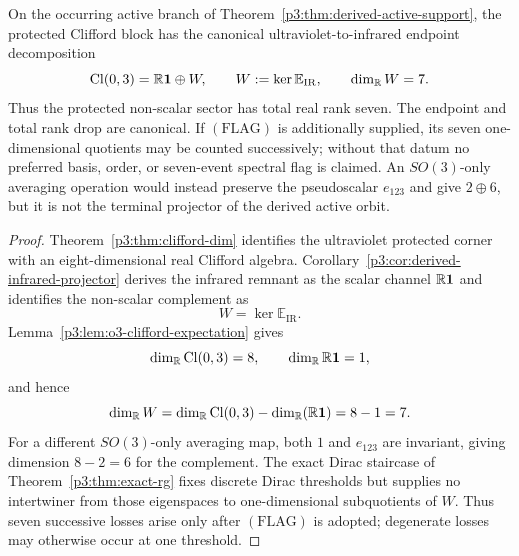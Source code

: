 \documentclass[12pt,a4paper]{article}
\begin{document}
\begin{theorem}
\label{p3:thm:hopf-decomposition}
On the occurring active branch of
Theorem~\ref{p3:thm:derived-active-support}, the protected Clifford block has
the canonical ultraviolet-to-infrared endpoint decomposition
\[
\operatorname{Cl}(0,3)=\mathbb{R}\mathbf 1\oplus W,
\qquad
W:=\ker\mathbb E_{\mathrm{IR}},
\qquad
\dim_{\mathbb{R}}W=7.
\]
Thus the protected non-scalar sector has total real rank seven.  The endpoint
and total rank drop are canonical.  If \((\mathrm{FLAG})\) is additionally
supplied, its seven one-dimensional quotients may be counted successively;
without that datum no preferred basis, order, or seven-event spectral flag is
claimed.  An \(SO(3)\)-only averaging operation would instead preserve the
pseudoscalar \(e_{123}\) and give \(2\oplus6\), but it is not the terminal
projector of the derived active orbit.
\end{theorem}

\begin{proof}
\leavevmode\par\noindent
Theorem~\ref{p3:thm:clifford-dim} identifies the ultraviolet protected corner
with an eight-dimensional real Clifford algebra.
Corollary~\ref{p3:cor:derived-infrared-projector} derives the infrared remnant
as the scalar channel \(\mathbb{R}\mathbf 1\) and identifies the non-scalar
complement as
\[
  W=\ker\mathbb E_{\mathrm{IR}}.
\]
Lemma~\ref{p3:lem:o3-clifford-expectation} gives
\[
  \dim_{\mathbb{R}}\operatorname{Cl}(0,3)=8,
  \qquad
  \dim_{\mathbb{R}}\mathbb{R}\mathbf 1=1,
\]
and hence
\[
\dim_{\mathbb{R}}W
=
\dim_{\mathbb{R}}\operatorname{Cl}(0,3)-\dim_{\mathbb{R}}(\mathbb{R}\mathbf 1)
=
8-1
=
7.
\]
For a different \(SO(3)\)-only averaging map, both \(1\) and \(e_{123}\) are
invariant, giving dimension \(8-2=6\) for the complement.  The exact Dirac staircase of
Theorem~\ref{p3:thm:exact-rg} fixes discrete Dirac thresholds but supplies no
intertwiner from those eigenspaces to one-dimensional subquotients of \(W\).
Thus seven successive losses arise only after \((\mathrm{FLAG})\) is adopted;
degenerate losses may otherwise occur at one threshold.
\end{proof}
\end{document}
